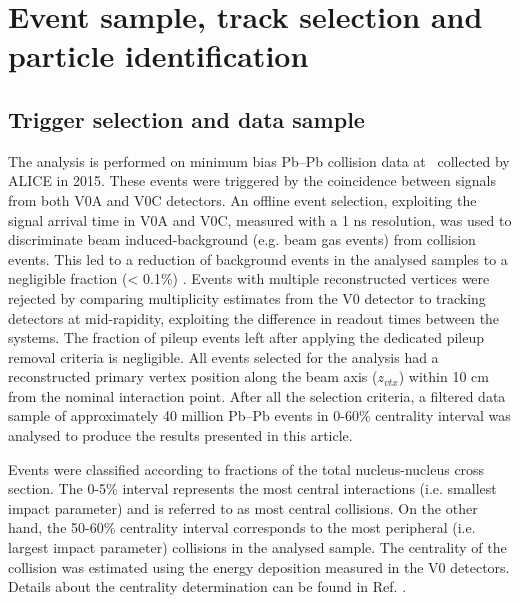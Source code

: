 \newpage
\section{Event sample, track selection and particle identification}
\label{Sec:EventTrackIdentification}
\subsection{Trigger selection and data sample}
\label{SubSec:Event}
The analysis is performed on minimum bias Pb--Pb collision data at \sNN~collected by ALICE in 2015. These events were triggered by the coincidence between signals from both V0A and V0C detectors. An offline event selection, exploiting the signal arrival time in V0A and V0C, measured with a 1 ns resolution, was used to discriminate beam induced-background (e.g. beam gas events) from collision events. This led to a reduction of background events in the analysed samples to a negligible fraction (< 0.1\%) \cite{Abelev:2014ffa}. Events with multiple reconstructed vertices were rejected by comparing multiplicity estimates from the V0 detector to tracking detectors at mid-rapidity, exploiting the difference in readout times between the systems. The fraction of pileup events left after applying the dedicated pileup removal criteria is negligible. All events selected for the analysis had a reconstructed primary vertex position along the beam axis ($z_{vtx}$) within 10 cm from the nominal interaction point. After all the selection criteria, a filtered data sample of approximately 40 million Pb--Pb events in 0-60\% centrality interval was analysed to produce the results presented in this article.

Events were classified according to fractions of the total nucleus-nucleus cross section. The 0-5\% interval represents the most central interactions (i.e. smallest impact parameter) and is referred to as most central collisions. On the other hand, the 50-60\% centrality interval corresponds to the most peripheral (i.e. largest impact parameter) collisions in the analysed sample. The centrality of the collision was estimated using the energy deposition measured in the V0 detectors. Details about the centrality determination can be found in Ref. \cite{Abelev:2013qoq}.


